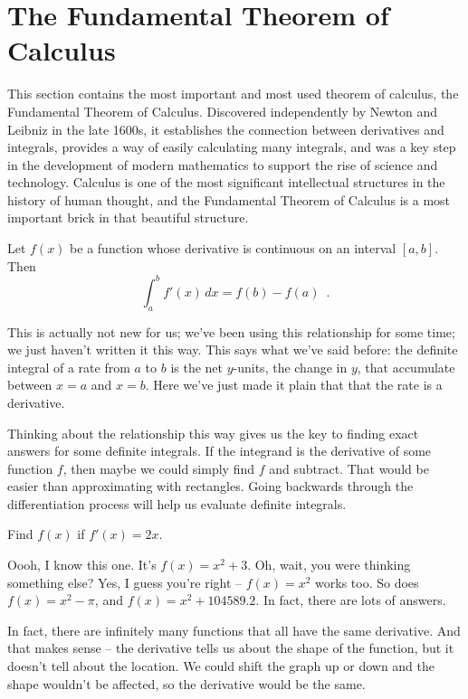 \section{The Fundamental Theorem of Calculus}
\label{sec:fund-theorem}
This section contains the most important and most used theorem of calculus, the Fundamental Theorem of Calculus. Discovered independently by Newton and Leibniz in the late 1600s, it establishes the connection between derivatives and integrals, provides a way of easily calculating many integrals, and was a key step in the development of modern mathematics to support the rise of science and technology. Calculus is one of the most significant intellectual structures in the history of human thought, and the Fundamental Theorem of Calculus is a most important brick in that beautiful structure.

\begin{theorem}
Let $f(x)$ be a function whose derivative is continuous on an interval $[a, b]$. Then
$$\int_a^b f'(x)\,dx = f(b)-f(a) \enspace .$$
\end{theorem}
This is actually not new for us; we've been using this relationship for some time; we just haven't written it this way. This says what we've said before: the definite integral of a rate from $a$ to $b$ is the net $y$-units, the change in $y$, that accumulate between $x=a$ and $x=b$. Here we've just made it plain that that the rate is a derivative.

Thinking about the relationship this way gives us the key to finding exact answers for some definite integrals. If the integrand is the derivative of some function $f$, then maybe we could simply find $f$ and subtract. That would be easier than approximating with rectangles. Going backwards through the differentiation process will help us evaluate definite integrals.

\begin{example}
Find $f(x)$ if $f'(x)=2x$.

\begin{solution}
Oooh, I know this one. It's $f(x)=x^2+3$. Oh, wait, you were thinking something else? Yes, I guess you're right -- $f(x)=x^2$ works too. So does $f(x)=x^2-\pi$, and $f(x)=x^2+104589.2$. In fact, there are lots of answers.
\end{solution}\end{example}

In fact, there are infinitely many functions that all have the same derivative. And that makes sense – the derivative tells us about the shape of the function, but it doesn't tell about the location. We could shift the graph up or down and the shape wouldn't be affected, so the derivative would be the same.

